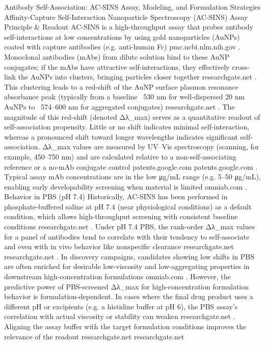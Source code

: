 Antibody Self-Association: AC-SINS Assay, Modeling, and Formulation Strategies
Affinity-Capture Self-Interaction Nanoparticle Spectroscopy (AC-SINS)
Assay Principle & Readout
AC-SINS is a high-throughput assay that probes antibody self-interactions at low concentrations by using gold nanoparticles (AuNPs) coated with capture antibodies (e.g. anti-human Fc)
pmc.ncbi.nlm.nih.gov
. Monoclonal antibodies (mAbs) from dilute solution bind to these AuNP conjugates; if the mAbs have attractive self-interactions, they effectively cross-link the AuNPs into clusters, bringing particles closer together
researchgate.net
. This clustering leads to a red-shift of the AuNP surface plasmon resonance absorbance peak (typically from a baseline ~530 nm for well-dispersed 20 nm AuNPs to ~574–600 nm for aggregated conjugates)
researchgate.net
. The magnitude of this red-shift (denoted Δλ_max) serves as a quantitative readout of self-association propensity. Little or no shift indicates minimal self-interaction, whereas a pronounced shift toward longer wavelengths indicates significant self-association. Δλ_max values are measured by UV–Vis spectroscopy (scanning, for example, 450–750 nm) and are calculated relative to a non-self-associating reference or a no-mAb conjugate control
patents.google.com
patents.google.com
. Typical assay mAb concentrations are in the low μg/mL range (e.g. 5–50 μg/mL), enabling early developability screening when material is limited
omniab.com
.
Behavior in PBS (pH 7.4)
Historically, AC-SINS has been performed in phosphate-buffered saline at pH 7.4 (near physiological conditions) as a default condition, which allows high-throughput screening with consistent baseline conditions
researchgate.net
. Under pH 7.4 PBS, the rank-order Δλ_max values for a panel of antibodies tend to correlate with their tendency to self-associate and even with in vivo behavior like nonspecific clearance
researchgate.net
researchgate.net
. In discovery campaigns, candidates showing low shifts in PBS are often enriched for desirable low-viscosity and low-aggregating properties in downstream high-concentration formulations
omniab.com
. However, the predictive power of PBS-screened Δλ_max for high-concentration formulation behavior is formulation-dependent. In cases where the final drug product uses a different pH or excipients (e.g. a histidine buffer at pH 6), the PBS assay’s correlation with actual viscosity or stability can weaken
researchgate.net
. Aligning the assay buffer with the target formulation conditions improves the relevance of the readout
researchgate.net
researchgate.net
